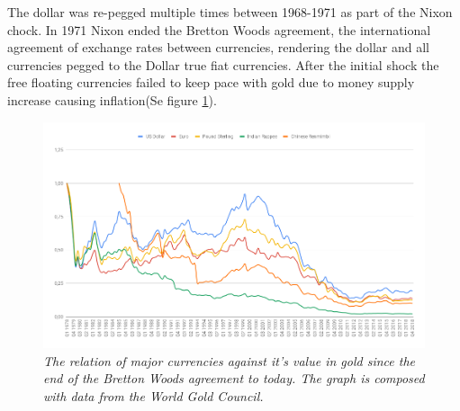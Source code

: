 The dollar was re-pegged multiple times between 1968-1971 as part of the Nixon chock\cite{bordo:bretton:woods}. In 1971 Nixon ended the Bretton Woods agreement\cite{bordo:bretton:woods}, the international agreement of exchange rates between currencies, rendering the dollar and all currencies pegged to the Dollar true fiat currencies. After the initial shock the free floating currencies failed to keep pace with gold due to money supply increase causing inflation(Se figure \ref{fig:gold:price:major:currency}).

\begin{figure}[!htb]
	\centering
	\includegraphics[width=16cm]{gold-price.png}
	\caption{\textit{The relation of major currencies against it's value in gold since the end of the Bretton Woods agreement to
			today. The graph is composed with data from the World Gold Council\cite{world:gold:council}. 
	}}
	\label{fig:gold:price:major:currency}
\end{figure}


\twocolumn

